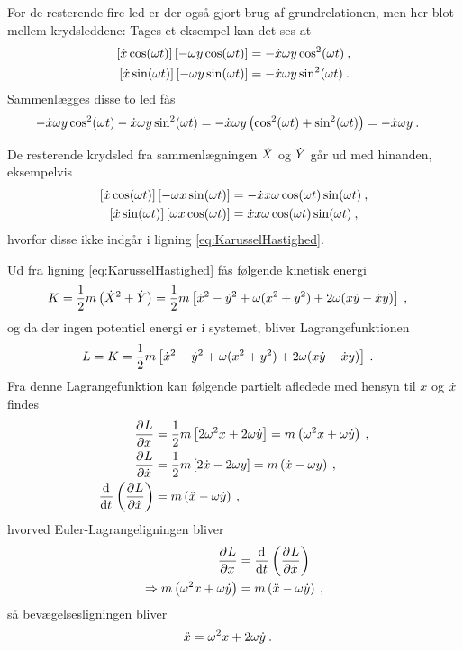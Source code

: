 \noindent
For de resterende fire led er der også gjort brug af grundrelationen, men her blot mellem krydsleddene: Tages et eksempel kan det ses at
%
\begin{align*}
	\left[\dt{x}\cos(\omega t)\right] \left[-\omega y\cos(\omega t)\right] &= -\dt{x}\omega y \cos^2(\omega t) \: , \\
	\left[\dt{x}\sin(\omega t)\right] \left[-\omega y\sin(\omega t)\right] &= -\dt{x}\omega y \sin^2(\omega t) \: .
\end{align*}
%
Sammenlægges disse to led fås
%
\begin{align*}
	-\dt{x}\omega y \cos^2(\omega t) -\dt{x}\omega y \sin^2(\omega t) &= -\dt{x}\omega y \left(\cos^2(\omega t) + \sin^2(\omega t)\right) = -\dt{x}\omega y \: .
\end{align*}

\noindent
De resterende krydsled fra sammenlægningen $\dt{X}$ og $\dt{Y}$ går ud med hinanden, eksempelvis
%
\begin{align*}
	\left[\dt{x}\cos(\omega t)\right] \left[-\omega x \sin(\omega t)\right] &= -\dt{x}x\omega\cos(\omega t)\sin(\omega t) \: , \\
	\left[\dt{x}\sin(\omega t)\right] \left[\omega x \cos(\omega t)\right] &= \dt{x}x\omega\cos(\omega t)\sin(\omega t) \: ,
\end{align*}
%
hvorfor disse ikke indgår i ligning \eqref{eq:KarusselHastighed}.

\noindent
Ud fra ligning \eqref{eq:KarusselHastighed} fås følgende kinetisk energi
%
\begin{align}
	K &= \frac{1}{2} m \left(\dt{X}^2 + \dt{Y}\right) = \frac{1}{2} m \left[ \dt{x}^2 - \dt{y}^2 + \omega(x^2 + y^2) + 2 \omega (x \dt{y} - \dt{x} y) \right] \: ,
\end{align}
%
og da der ingen potentiel energi er i systemet, bliver Lagrangefunktionen
%
\begin{align}
	L &= K = \frac{1}{2} m \left[ \dt{x}^2 - \dt{y}^2 + \omega(x^2 + y^2) + 2 \omega (x \dt{y} - \dt{x} y) \right] \: .
\end{align}
%
Fra denne Lagrangefunktion kan følgende partielt afledede med hensyn til $x$ og $\dt{x}$ findes
%
\begin{align}
	\pdif{x}{L} &= \frac{1}{2} m \left[ 2\omega^2x + 2\omega \dt{y} \right] = m \left( \omega^2x + \omega \dt{y} \right) \: , \\
	\pdif{\dt{x}}{L} &= \frac{1}{2} m \left[ 2 \dt{x} - 2\omega y \right] = m \left( \dt{x} - \omega y \right) \: , \\
	 \dif{t}{} \left( \pdif{\dt{x}}{L} \right) &= m \left( \ddt{x} - \omega \dt{y} \right) \: ,
\end{align}
%
hvorved Euler-Lagrangeligningen bliver
%
\begin{align}
	\pdif{x}{L} &= \dif{t}{} \left( \pdif{\dt{x}}{L} \right) \nonumber \\
	\Rightarrow m \left( \omega^2 x + \omega \dt{y} \right) &= m \left( \ddt{x} - \omega \dt{y} \right) \: ,
\end{align}
%
så bevægelsesligningen bliver
%
\begin{align} \label{eq:xKarusel}
	\ddt{x} &= \omega^2x + 2 \omega \dt{y} \: .
\end{align}


